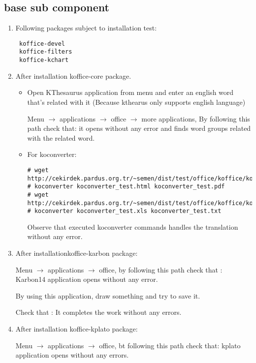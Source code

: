 \documentclass[a4paper,10pt]{article}
\begin{document}
\subsection*{base sub component}
\begin{enumerate}
\item Following packages subject to installation test:

\begin{verbatim}
 koffice-devel 
 koffice-filters
 koffice-kchart
\end{verbatim}
\item After installation koffice-core package.

\begin{itemize}
\item Open KThesaurus application from menu and enter an english word that's related with it (Because kthearus only supports english language)

Menu $\rightarrow$ applications $\rightarrow$ office $\rightarrow$ more applications, By following this path check that: it opens without any error and finds word groups related with the related word.

\item For koconverter:
\begin{verbatim}
# wget http://cekirdek.pardus.org.tr/~semen/dist/test/office/koffice/koconverter_test.html
# koconverter koconverter_test.html koconverter_test.pdf
# wget http://cekirdek.pardus.org.tr/~semen/dist/test/office/koffice/koconverter_test.xls
# koconverter koconverter_test.xls koconverter_test.txt
\end{verbatim}

Observe that executed koconverter commands handles the translation without any error.
\end{itemize}
\item After installationkoffice-karbon package:

Menu $\rightarrow$ applications $\rightarrow$ office, by following this path check that :  Karbon14 application opens without any error.

By using this application, draw  something and try to save it.

Check that : It completes the work without any errors.

\item After installation koffice-kplato package:

Menu $\rightarrow$ applications $\rightarrow$ office, bt following this path check that: kplato application opens without any errors.


\end{enumerate}
\end{document}
